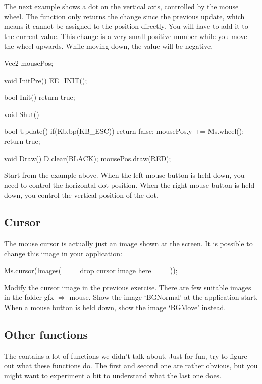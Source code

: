 The next example shows a dot on the vertical axis, controlled by the mouse wheel. The function  only returns the change since the previous update, which means it cannot be assigned to the position directly. You will have to add it to the current value. This change is a very small positive number while you move the wheel upwards. While moving down, the value will be negative.

\begin{code}
Vec2 mousePos;

void InitPre()
{
   EE_INIT();
}

bool Init()
{   
   return true;
}

void Shut() {}

bool Update()
{
   if(Kb.bp(KB_ESC)) return false;  
   mousePos.y += Ms.wheel();  
   return true;
}

void Draw()
{
   D.clear(BLACK);
   mousePos.draw(RED);
}
\end{code}

\begin{exercise}
Start from the example above. When the left mouse button is held down, you need to control the horizontal dot position. When the right mouse button is held down, you control the vertical position of the dot.
\end{exercise} 

\subsection{Cursor}
The mouse cursor is actually just an image shown at the screen. It is possible to change this image in your application:

\begin{code}
Ms.cursor(Images( ===drop cursor image here=== ));
\end{code}

\begin{exercise}
Modify the cursor image in the previous exercise. There are few suitable images in the folder gfx $\Rightarrow$ mouse.  Show the image `BGNormal' at the application start. When a mouse button is held down, show the image `BGMove' instead.
\end{exercise}

\subsection{Other functions}
The  contains a lot of functions we didn't talk about. Just for fun, try to figure out what these functions do. The first and second one are rather obvious, but you might want to experiment a bit to understand what the last one does. 

